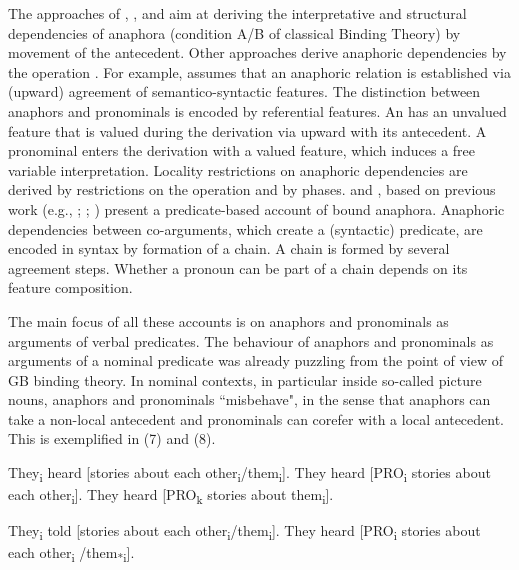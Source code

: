 \documentclass[output=paper]{langsci/langscibook}
\begin{document}
The approaches of \citet{Hornstein2001,Hornstein2007}, \citet{Boeckx2010}, \citet{Zwart2002} and \citet{Kayne2002} aim at deriving the interpretative and structural dependencies of anaphora (condition A\slash B of classical Binding Theory) by movement of the antecedent. Other approaches derive anaphoric dependencies by the operation . For example, \citet{Hicks2009} assumes that an anaphoric relation is established via (upward) agreement of semantico-syntactic features. The distinction between anaphors and pronominals is encoded by referential features. An  has an unvalued feature that is valued during the derivation via upward  with its antecedent. A pronominal enters the derivation with a valued feature, which induces a free variable interpretation. Locality restrictions on anaphoric dependencies are derived by restrictions on the operation  and by phases. \citet{Reinhart2006} and \citet{Reuland2011}, based on previous work (e.g., \citealt{Reinhart1983}; \citealt{Reinhart1993,Reinhart1995}; \citealt{Reuland2001}) present a predicate-based account of bound anaphora. Anaphoric dependencies between co-arguments, which create a  (syntactic) predicate, are encoded in syntax by formation of a chain. A chain is formed by several agreement steps. Whether a pronoun can be part of a chain depends on its feature composition.

The main focus of all these accounts is on anaphors and pronominals as arguments of verbal predicates. The behaviour of anaphors and pronominals as arguments of a nominal predicate was already puzzling from the point of view of GB binding theory. In nominal contexts, in particular inside so-called picture nouns, anaphors and pronominals “misbehave", in the sense that anaphors can take a non-local antecedent and pronominals can corefer with a local antecedent. This is exemplified in (7) and (8). 

\ea%
    \citep[166–167]{Chomsky1986Knowledge}\label{ex:wein:7}
\ea  They\textsubscript{i} heard [stories about each other\textsubscript{i}\slash them\textsubscript{i}].
\ex  They heard [PRO\textsubscript{i} stories about each other\textsubscript{i}].
\ex  They heard [PRO\textsubscript{k} stories about them\textsubscript{i}].
    \z
\z

\ea%
    \label{ex:wein:8}
    \ea They\textsubscript{i} told [stories about each other\textsubscript{i}\slash *them\textsubscript{i}].
    \ex They heard [PRO\textsubscript{i} stories about each other\textsubscript{i} /them\textsubscript{*i}].
    \z
\z
\end{document}
